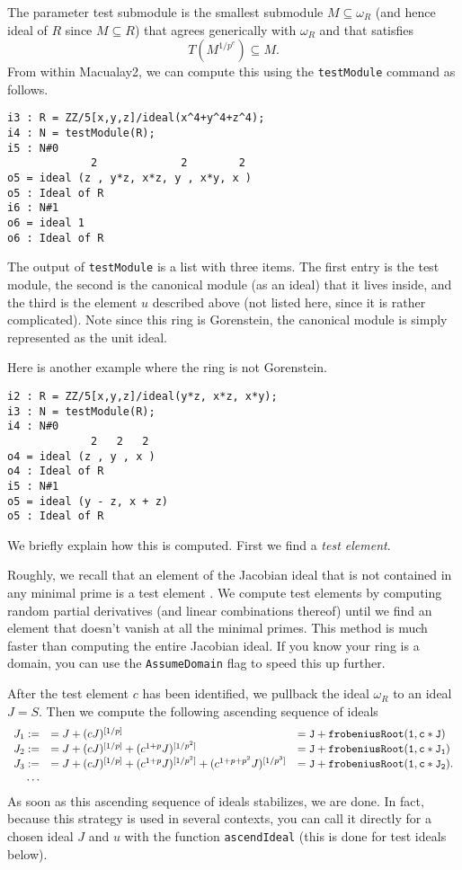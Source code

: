 \documentclass[11pt]{amsart}
\begin{document}
The parameter test submodule is the smallest submodule $M \subseteq \omega_R$ (and hence ideal of $R$ since $M \subseteq R$) that agrees generically with $\omega_R$ and that satisfies
\[
T (M^{1/p^e}) \subseteq M.
\]
From within Macualay2, we can compute this using the {\tt testModule} command as follows.
\begin{verbatim}
i3 : R = ZZ/5[x,y,z]/ideal(x^4+y^4+z^4);
i4 : N = testModule(R);
i5 : N#0
             2             2        2
o5 = ideal (z , y*z, x*z, y , x*y, x )
o5 : Ideal of R
i6 : N#1
o6 = ideal 1
o6 : Ideal of R
\end{verbatim}
The output of {\tt testModule} is a list with three items.  The first entry is the test module, the second is the canonical module (as an ideal) that it lives inside, and the third is the element $u$ described above (not listed here, since it is rather complicated).  Note since this ring is Gorenstein, the canonical module is simply represented as the unit ideal.

Here is another example where the ring is not Gorenstein.
\begin{verbatim}
i2 : R = ZZ/5[x,y,z]/ideal(y*z, x*z, x*y);
i3 : N = testModule(R);
i4 : N#0
             2   2   2
o4 = ideal (z , y , x )
o4 : Ideal of R
i5 : N#1
o5 = ideal (y - z, x + z)
o5 : Ideal of R
\end{verbatim}

We briefly explain how this is computed.  First we find a \emph{test element}.
\begin{remark}
\label{rem.ComputationOfTestElements}
Roughly, we recall that an element of the Jacobian ideal that is not contained in any minimal prime is a test element \cite{}.  We compute test elements by computing random partial derivatives (and linear combinations thereof) until we find an element that doesn't vanish at all the minimal primes.  This method is much faster than computing the entire Jacobian ideal.  If you know your ring is a domain, you can use the {\tt AssumeDomain} flag to speed this up further.
\end{remark}

After the test element $c$ has been identified, we pullback the ideal $\omega_R$ to an ideal $J = S$.  Then we compute the following ascending sequence of ideals
\begin{equation}
\label{eq.AscendIdealExplanation}
\begin{array}{rll}
J_1 := & = J + (c J)^{[1/p]} & = {\tt J + frobeniusRoot(1, c*J)}\\
J_2 := & = J + (c J)^{[1/p]} + (c^{1+p} J)^{[1/p^2]} & = {\tt J + frobeniusRoot(1, c*J_1)}\\
J_3 := & = J + (c J)^{[1/p]} + (c^{1+p} J)^{[1/p^2]} + (c^{1+p+p^2} J)^{[1/p^3]} & = {\tt J + frobeniusRoot(1, c*J_2)}.\\
\dots
\end{array}
\end{equation}
As soon as this ascending sequence of ideals stabilizes, we are done.
In fact, because this strategy is used in several contexts, you can call it directly for a chosen ideal $J$ and $u$ with the function {\tt ascendIdeal} (this is done for test ideals below).
\end{document}
